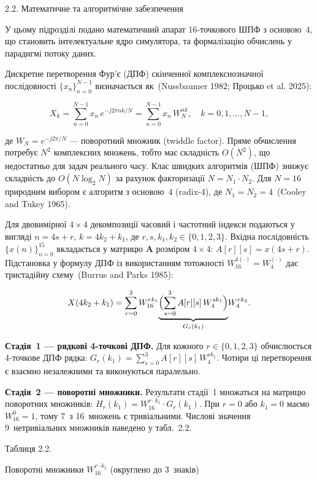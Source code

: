 \protect{}\label{_Toc228121450}{}2.2. Математичне та
алгоритмічне забезпечення

У цьому підрозділі подано математичний апарат 16-точкового ШПФ з
основою~4, що становить інтелектуальне ядро симулятора, та формалізацію
обчислень у парадигмі потоку даних.

Дискретне перетворення Фур'є (ДПФ) скінченної комплекснозначної
послідовності \(\{x_{n}\}_{n=0}^{N-1}\) визначається як~(Nussbaumer
1982; Процько et al. 2025):

\[X_{k} = \sum_{n=0}^{N-1}x_{n}\,e^{-j2\pi nk/N} = \sum_{n=0}^{N-1}x_{n}\,W_{N}^{nk},\quad k = 0,1,\ldots,N-1,\]

де \(W_{N}=e^{-j2\pi/N}\) --- поворотний множник (twiddle factor). Пряме
обчислення потребує \(N^{2}\) комплексних множень, тобто має складність
\(O(N^{2})\), що недостатньо для задач реального часу. Клас швидких
алгоритмів (ШПФ) знижує складність до \(O(N\log_{2}N)\) за рахунок
факторизації \(N=N_{1}\cdot N_{2}\). Для \(N=16\) природним вибором є
алгоритм з основою~4 (radix-4), де \(N_{1}=N_{2}=4\)~(Cooley and
Tukey 1965).

Для двовимірної \(4\times4\) декомпозиції часовий і частотний індекси
подаються у вигляді \(n=4s+r\), \(k=4k_{2}+k_{1}\),
де \(r,s,k_{1},k_{2}\in\{0,1,2,3\}\). Вхідна послідовність
\(\{x(n)\}_{n=0}^{15}\) вкладається у матрицю \(\mathbf{A}\) розміром
\(4\times4\): \(A[r][s]=x(4s+r)\). Підстановка у формулу ДПФ із
використанням тотожності \(W_{16}^{4(\cdot)}=W_{4}^{(\cdot)}\) дає
тристадійну схему~(Burrus and Parks 1985):

\[X(4k_{2}+k_{1}) = \sum_{r=0}^{3}W_{16}^{rk_{1}}
\underset{G_{r}(k_{1})}{\underbrace{\Bigl(\sum_{s=0}^{3}A[r][s]\,W_{4}^{sk_{1}}\Bigr)}}
W_{4}^{rk_{2}}.\]

\textbf{Стадія~1 --- рядкові 4-точкові ДПФ.} Для кожного
\(r\in\{0,1,2,3\}\) обчислюється 4-точкове ДПФ рядка:
\(G_{r}(k_{1})=\sum_{s=0}^{3}A[r][s]\,W_{4}^{sk_{1}}\). Чотири ці
перетворення є взаємно незалежними та виконуються паралельно.

\textbf{Стадія~2 --- поворотні множники.} Результати стадії~1
множаться на матрицю поворотних множників:
\(H_{r}(k_{1})=W_{16}^{r\cdot k_{1}}\cdot G_{r}(k_{1})\). При
\(r=0\) або \(k_{1}=0\) маємо \(W_{16}^{0}=1\), тому 7~з 16~множень є
тривіальними. Числові значення 9~нетривіальних множників наведено у
табл.~2.2.

Таблиця 2.2.

Поворотні множники \(W_{16}^{r\cdot k_{1}}\) (округлено до 3~знаків)

